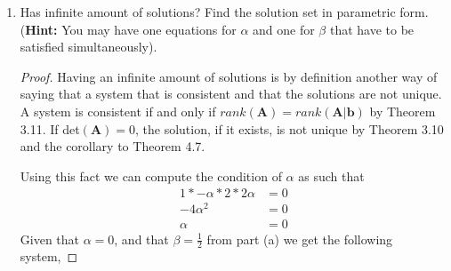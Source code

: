 \documentclass[11pt]{scrartcl}
\begin{document}
\begin{enumerate}[label=\alph*.]
{\begin{proof}
		      \[
			      x = \begin{bmatrix}
				      \frac12 + \frac{1}{2\alpha} \\
				      -\frac{1}{2\alpha}          \\
				      \frac34                     \\
				      \frac12
			      \end{bmatrix}
		      \]
		      as desired.
	      \end{proof}
	      }

	\item{
	      Has infinite amount of solutions? Find the solution set in parametric form.
	      (\textbf{Hint:} You may have one equations for $\alpha$ and one for $\beta$ that have to be satisfied simultaneously).
	      \begin{proof}
		      Having an infinite amount of solutions is by definition another way of saying
		      that a system that is consistent and that the solutions are not unique.
		      A system is consistent if and only if $rank(\mathbf{A}) = rank(\mathbf{A}|\mathbf{b})$
		      by Theorem 3.11. If det$(\mathbf{A}) = 0$, the solution, if it exists, is not unique by
		      Theorem 3.10 and the corollary to Theorem 4.7.

		      Using this fact we can compute the condition of $\alpha$ as such that
		      \begin{align*}
			      1*-\alpha*2*2\alpha & = 0 \\
			      -4\alpha^2          & = 0 \\
			      \alpha              & = 0
		      \end{align*}
		      Given that $\alpha = 0$, and that $\beta = \frac12$ from part (a)
		      we get the following system,


\end{proof}}
\end{enumerate}
\end{document}
